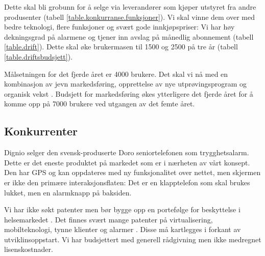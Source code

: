 Dette skal bli grobunn for å selge via leverandører som kjøper utstyret fra
andre produsenter (tabell \vref{table.konkurranse.funksjoner}).  Vi skal vinne
dem over med bedre teknologi, flere funksjoner og svært gode innkjøpspriser: Vi
har høy dekningsgrad på alarmene og tjener inn avslag på månedlig abonnement
(tabell \vref{table.drift}).  Dette skal øke brukermasen til 1500 og 2500 på
tre år (tabell \vref{table.driftsbudsjett}).

Målsetningen for det fjerde året er 4000 brukere. Det skal vi nå med en
kombinasjon av jevn markedsføring, opprettelse av nye utprøvingsprogram og
organisk vekst \cite{bessant}.  Budsjett for markedsføring økes ytterligere det
fjerde året for å komme opp på 7000 brukere ved utgangen av det femte året.

\subsection{Konkurrenter}


Dignio selger den svensk-produserte Doro seniortelefonen som trygghetsalarm.
Dette er det eneste produktet på markedet som er i nærheten av vårt konsept.
Den har GPS og kan oppdateres med ny funksjonalitet over nettet, men skjermen
er ikke den primære interaksjonsflaten: Det er en klapptelefon som skal brukes
lukket, men en alarmknapp på baksiden.

Vi har ikke søkt patenter men bør bygge opp en portefølge for beskyttelse i
helsemarkedet \cite{slides.chery}.  Det finnes svært mange patenter på
virtualisering, mobilteknologi, tynne klienter og alarmer
\cite{patent.ricordi2008mobile, patent.heinz2013wearable}. Disse må kartlegges
i forkant av utviklinsoppstart. Vi har budsjettert med generell rådgivning men
ikke medregnet lisenskostnader.

